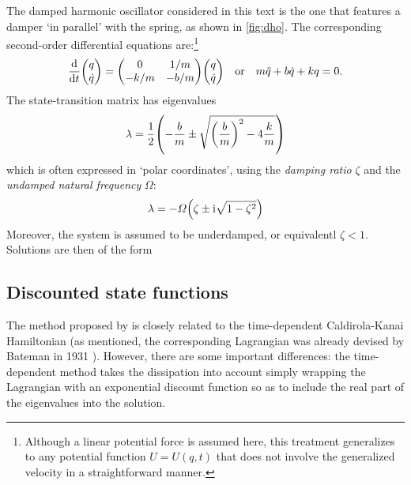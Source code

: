 The damped harmonic oscillator considered in this text is the one that features a damper `in parallel' with the spring, as shown in \cref{fig:dho}. The corresponding second-order differential equations are:\footnote{Although a linear potential force is assumed here, this treatment generalizes to any potential function $U = U(q, t)$ that does not involve the generalized velocity in a straightforward manner.}
\begin{equation}
    \dv{}{t}\mqty(q\\\dot{q}) = \mqty(0 & 1/m\\-k/m & -b/m)\mqty(q\\\dot{q}) \quad \text{or}\quad m\ddot{q} + b\dot{q} + kq = 0.
    \label{eq:dho}
\end{equation}
The state-transition matrix has eigenvalues
$$ \lambda = \frac{1}{2}\qty(-\frac{b}{m}\pm\sqrt{\qty(\frac{b}{m})^2 - 4\frac{k}{m}}) $$
which is often expressed in `polar coordinates', using the \emph{damping ratio} $\zeta$ and the \emph{undamped natural frequency} $\Omega$:
$$ \lambda = -\Omega \qty(\zeta \pm \mathrm{i}\sqrt{1 - \zeta^2}) $$
Moreover, the system is assumed to be underdamped, or equivalentl $\zeta < 1$. Solutions are then of the form
$$ $$

\subsection{Discounted state functions}
The method proposed by \citet{Mendel2021} is closely related to the time-dependent Caldirola-Kanai Hamiltonian (as mentioned, the corresponding Lagrangian was already devised by Bateman in 1931 \cite{Bateman1931, Dekker1981}). However, there are some important differences: the time-dependent method takes the dissipation into account simply wrapping the Lagrangian with an exponential discount function so as to include the real part of the eigenvalues into the solution.


